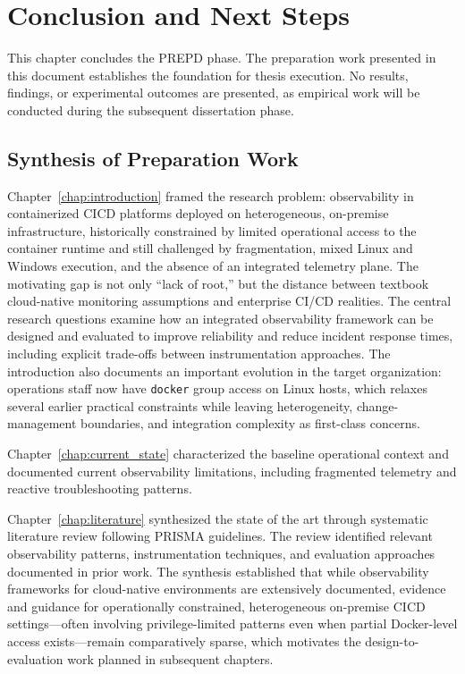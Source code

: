 
\chapter{Conclusion and Next Steps}
\label{chap:conclusion}

This chapter concludes the \ac{PREPD} phase. The preparation work presented in this document establishes the foundation for thesis execution. No results, findings, or experimental outcomes are presented, as empirical work will be conducted during the subsequent dissertation phase.

\section{Synthesis of Preparation Work}

Chapter~\ref{chap:introduction} framed the research problem: observability in containerized \ac{CICD} platforms deployed on heterogeneous, on-premise infrastructure, historically constrained by limited operational access to the container runtime and still challenged by fragmentation, mixed Linux and Windows execution, and the absence of an integrated telemetry plane. The motivating gap is not only ``lack of root,'' but the distance between textbook cloud-native monitoring assumptions and enterprise CI/CD realities. The central research questions examine how an integrated observability framework can be designed and evaluated to improve reliability and reduce incident response times, including explicit trade-offs between instrumentation approaches. The introduction also documents an important evolution in the target organization: operations staff now have \texttt{docker} group access on Linux hosts, which relaxes several earlier practical constraints while leaving heterogeneity, change-management boundaries, and integration complexity as first-class concerns.

Chapter~\ref{chap:current_state} characterized the baseline operational context and documented current observability limitations, including fragmented telemetry and reactive troubleshooting patterns.

Chapter~\ref{chap:literature} synthesized the state of the art through systematic literature review following \ac{PRISMA} guidelines. The review identified relevant observability patterns, instrumentation techniques, and evaluation approaches documented in prior work. The synthesis established that while observability frameworks for cloud-native environments are extensively documented, evidence and guidance for operationally constrained, heterogeneous on-premise \ac{CICD} settings---often involving privilege-limited patterns even when partial Docker-level access exists---remain comparatively sparse, which motivates the design-to-evaluation work planned in subsequent chapters.

